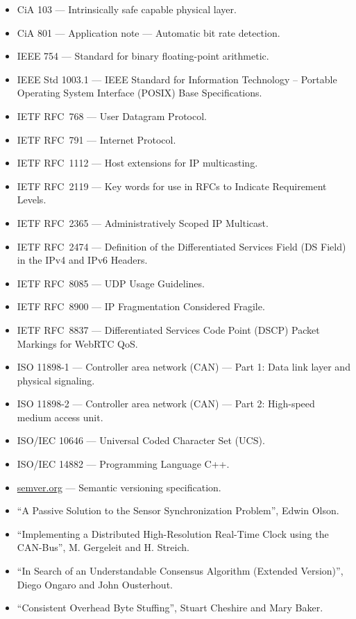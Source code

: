 \begin{itemize}
    \item CiA 103 --- Intrinsically safe capable physical layer.
    \item CiA 801 --- Application note --- Automatic bit rate detection.

    \item IEEE 754 --- Standard for binary floating-point arithmetic.
    \item IEEE Std 1003.1 --- IEEE Standard for Information Technology --
          Portable Operating System Interface (POSIX) Base Specifications.

    \item IETF RFC~768 --- User Datagram Protocol.
    \item IETF RFC~791 --- Internet Protocol.
    \item IETF RFC~1112 --- Host extensions for IP multicasting.
    \item IETF RFC~2119 --- Key words for use in RFCs to Indicate Requirement Levels.
    \item IETF RFC~2365 --- Administratively Scoped IP Multicast.
    \item IETF RFC~2474 --- Definition of the Differentiated Services Field (DS Field) in the IPv4 and IPv6 Headers.
    \item IETF RFC~8085 --- UDP Usage Guidelines.
    \item IETF RFC~8900 --- IP Fragmentation Considered Fragile.
    \item IETF RFC~8837 --- Differentiated Services Code Point (DSCP) Packet Markings for WebRTC QoS.

    \item ISO 11898-1 --- Controller area network (CAN) --- Part 1: Data link layer and physical signaling.
    \item ISO 11898-2 --- Controller area network (CAN) --- Part 2: High-speed medium access unit.
    \item ISO/IEC 10646 --- Universal Coded Character Set (UCS).
    \item ISO/IEC 14882 --- Programming Language C++.

    \item \href{http://semver.org}{semver.org} --- Semantic versioning specification.

    \item ``A Passive Solution to the Sensor Synchronization Problem'', Edwin Olson.
    \item ``Implementing a Distributed High-Resolution Real-Time Clock using the CAN-Bus'', M. Gergeleit and H. Streich.
    \item ``In Search of an Understandable Consensus Algorithm (Extended Version)'', Diego Ongaro and John Ousterhout.
    \item ``Consistent Overhead Byte Stuffing'', Stuart Cheshire and Mary Baker.
\end{itemize}


